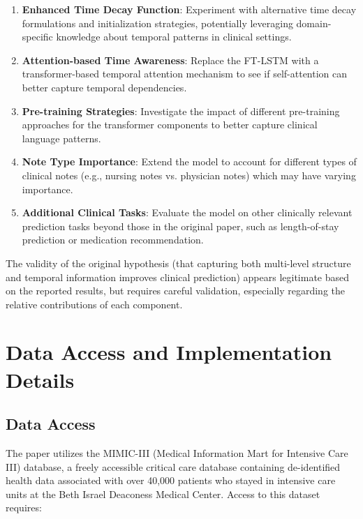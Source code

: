 \documentclass[10pt,letterpaper,twocolumn]{article}
\begin{document}
\begin{enumerate}[leftmargin=*]
    \item \textbf{Enhanced Time Decay Function}: Experiment with alternative time decay formulations and initialization strategies, potentially leveraging domain-specific knowledge about temporal patterns in clinical settings.
    
    \item \textbf{Attention-based Time Awareness}: Replace the FT-LSTM with a transformer-based temporal attention mechanism to see if self-attention can better capture temporal dependencies.
    
    \item \textbf{Pre-training Strategies}: Investigate the impact of different pre-training approaches for the transformer components to better capture clinical language patterns.
    
    \item \textbf{Note Type Importance}: Extend the model to account for different types of clinical notes (e.g., nursing notes vs. physician notes) which may have varying importance.
    
    \item \textbf{Additional Clinical Tasks}: Evaluate the model on other clinically relevant prediction tasks beyond those in the original paper, such as length-of-stay prediction or medication recommendation.
\end{enumerate}

The validity of the original hypothesis (that capturing both multi-level structure and temporal information improves clinical prediction) appears legitimate based on the reported results, but requires careful validation, especially regarding the relative contributions of each component.

\section{Data Access and Implementation Details}

\subsection{Data Access}

The paper utilizes the MIMIC-III (Medical Information Mart for Intensive Care III) database, a freely accessible critical care database containing de-identified health data associated with over 40,000 patients who stayed in intensive care units at the Beth Israel Deaconess Medical Center. Access to this dataset requires:
\end{document}
